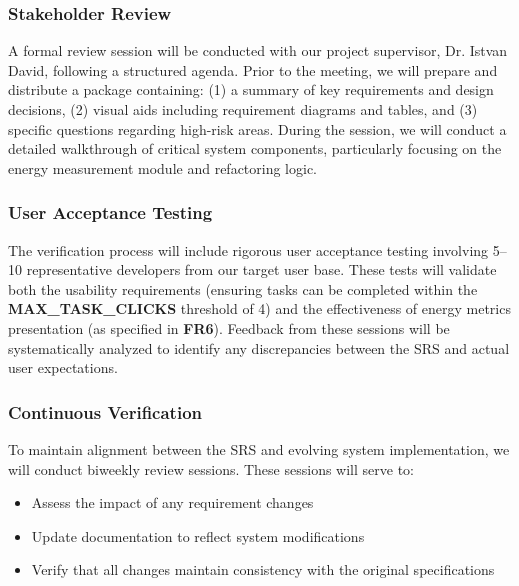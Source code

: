 \documentclass[12pt, titlepage]{article}
\begin{document}
\subsubsection{Stakeholder Review}
A formal review session will be conducted with our project supervisor, Dr. Istvan David, following a structured agenda. Prior to the meeting, we will prepare and distribute a package containing: (1) a summary of key requirements and design decisions, (2) visual aids including requirement diagrams and tables, and (3) specific questions regarding high-risk areas. During the session, we will conduct a detailed walkthrough of critical system components, particularly focusing on the energy measurement module and refactoring logic.

\subsubsection{User Acceptance Testing}
The verification process will include rigorous user acceptance testing involving 5--10 representative developers from our target user base. These tests will validate both the usability requirements (ensuring tasks can be completed within the \textbf{MAX\_TASK\_CLICKS} threshold of 4) and the effectiveness of energy metrics presentation (as specified in \textbf{FR6}). Feedback from these sessions will be systematically analyzed to identify any discrepancies between the SRS and actual user expectations.

\subsubsection{Continuous Verification}
To maintain alignment between the SRS and evolving system implementation, we will conduct biweekly review sessions. These sessions will serve to:
\begin{itemize}[nosep]
    \item Assess the impact of any requirement changes
    \item Update documentation to reflect system modifications
    \item Verify that all changes maintain consistency with the original specifications
\end{itemize}
\end{document}
